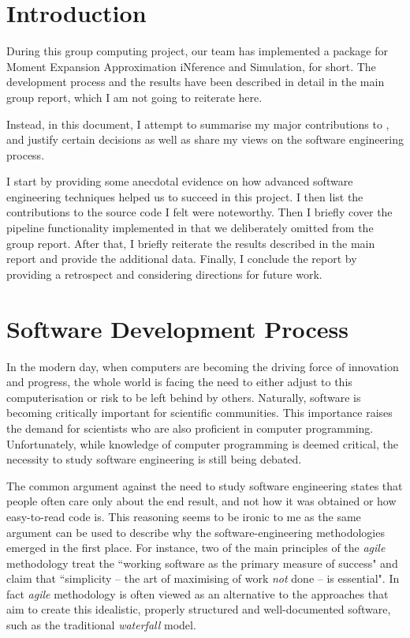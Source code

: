 \section{Introduction}

During this group computing project, our team has implemented a \py{} package for Moment Expansion Approximation iNference and Simulation, \means{} for short. 
The development process and the results have been described in detail in the main group report, which I am not going to reiterate here.

Instead, in this document, I attempt to summarise my major contributions to \means{}, and justify certain decisions as well as share my views on the software engineering process.

I start by providing some anecdotal evidence on how advanced software engineering techniques helped us to succeed in this project. 
I then list the contributions to the source code I felt were noteworthy. Then I briefly cover the pipeline functionality implemented in \means{} that we deliberately omitted from the group report.
After that, I briefly reiterate the results described in the main report and provide the additional data.
Finally, I conclude the report by providing a retrospect and considering directions for future work.

\section{Software Development Process}

In the modern day, when computers are becoming the driving force of innovation and progress, the whole world is facing the need to either adjust to this computerisation or risk to be left behind by others.
Naturally, software is becoming critically important for scientific communities. This importance raises the demand for scientists who are also proficient in computer programming. Unfortunately, while knowledge of computer programming is deemed critical, the necessity to study software engineering is still being debated. 

The common argument against the need to study software engineering states that people often care only about the end result, and not how it was obtained or how easy-to-read code is.
This reasoning seems to be ironic to me as the same argument can be used to describe why the software-engineering methodologies emerged in the first place. 
For instance, two of the main principles of the \emph{agile} methodology\cite{_manifesto_????} treat the ``working software as the primary measure of success" and claim that ``simplicity -- the art of maximising of work \emph{not} done -- is essential"\cite{paulk_agile_2002}. 
In fact \emph{agile} methodology is often viewed as an alternative to the approaches that aim to create this idealistic, properly structured and well-documented software, such as the traditional \emph{waterfall} model.

